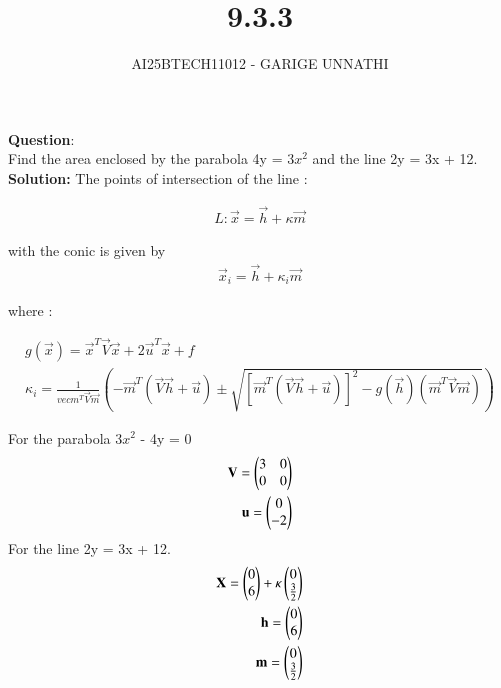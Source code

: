 \documentclass[journal]{IEEEtran}
\begin{document}

\vspace{3cm}

\title{9.3.3}
\author{AI25BTECH11012 - GARIGE UNNATHI}
{\let\newpage\relax\maketitle}


\renewcommand{\thefigure}{\theenumi}
\renewcommand{\thetable}{\theenumi}
\setlength{\intextsep}{10pt} %


\renewcommand{\thetable}{\theenumi}


\textbf{Question}:\\
Find the area enclosed by the parabola 4y = 3$x^2$ and the line 2y = 3x + 12.\\

\textbf{Solution: }
The points of intersection of the line :

\begin{align}
  L : \vec{x} = \vec{h} + \kappa\vec{m}
\end{align}

with the conic  is given by 
\begin{align}
   \vec{x}_i = \vec{h} + \kappa_i\vec{m}
\end{align}

where :

\begin{align*}
 g(\vec{x}) = \vec{x}^{T}\vec{V}\vec{x} + 2\vec{u}^{T}\vec{x} + f\\ 
\kappa_i = \frac{1}
{vec{m}^{T}\vec{V}\vec{m}}(-\vec{m}^{T}(\vec{V}\vec{h} + \vec{u}) \pm \sqrt{[\vec{m}^{T}(\vec{V}\vec{h}+\vec{u})]^{2} - g(\vec{h})(\vec{m}^{T}\vec{V}\vec{m})})
\end{align*}

For the parabola 3$x^2$ - 4y = 0
\begin{align}
   \mathbf{V} = \begin{pmatrix}3 & 0\\0& 0\end{pmatrix}\\
   \mathbf{u} = \begin{pmatrix}0\\-2\end{pmatrix}
\end{align}
For the line  2y = 3x + 12.
\begin{align}
  \mathbf{X} = \begin{pmatrix}0\\6\end{pmatrix} + \kappa\begin{pmatrix}0 \\ \frac{3}{2}\end{pmatrix}\\
  \mathbf{h} = \begin{pmatrix}0\\6\end{pmatrix}\\
  \mathbf{m} = \begin{pmatrix}0 \\ \frac{3}{2}\end{pmatrix}
\end{align}
\end{document}
